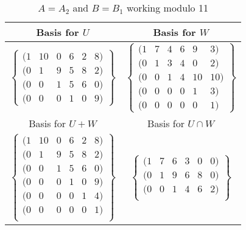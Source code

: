 \documentclass[10pt,a4paper,notitlepage]{article}
\begin{document}
\begin{table}[H]
\centering
\begin{tabular}{|c|c|}
\hline
Basis for $U$ & Basis for $W$ \\
\hline
$\left\lbrace\begin{array}{cccccc}
(1&10&0&6&2&8)\\
(0&1&9&5&8&2)\\
(0&0&1&5&6&0)\\
(0&0&0&1&0&9)
\end{array}
\right\rbrace$ & $\left\lbrace\begin{array}{cccccc}
(1     &7     &4     &6     &9     &3)\\
 (    0     &1     &3     &4     &0     &2)\\
  (   0     &0     &1    & 4   & 10   & 10)\\
   (  0   &  0   &  0  &   0 &    1   &  3)\\
    ( 0   &  0 &    0   &  0  &   0   &  1)
\end{array}
\right\rbrace$ \\
\hline Basis for $U+W$ & Basis for $U\cap W$\\
\hline $\left\lbrace\begin{array}{cccccc}
(1    &10   &  0   &  6   &  2  &   8)\\
 (    0    & 1  &   9   &  5   &  8   &  2)\\
  (   0  &   0   &  1   & 5    & 6   &  0)\\
  (   0  &   0    & 0  &   1  &   0  &   9)\\
    ( 0   &  0    & 0  &   0   &  1  &   4)\\
    (0   &  0     &0  &   0   &  0     &1)\\
\end{array}
\right\rbrace$ & $\left\lbrace\begin{array}{cccccc}
 (1    & 7     &6     &3     &0     &0)\\
  (   0  &   1   &  9   &  6   &  8   &  0)\\
   (  0     &0     &1     &4     &6     &2)\\
\end{array}
\right\rbrace$ \\
\hline
\end{tabular}
\caption{$A=A_{2}$ and $B=B_{1}$ working modulo 11}
\label{Q7.1}
\end{table}
\end{document}
